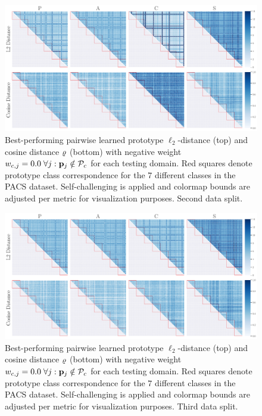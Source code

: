\begin{figure}[h]
    \centering
    \includegraphics[width=\textwidth]{Figures/Chapter4/2021-01-21-ProDropIncorrectWeight0.0WithSCdrop_f0.5SAVEResNet18oracle_validation_trial1.pdf}
    \caption[Second data split pairwise self-challenging prototype distances with $w_{c,j} = 0.0$] {Best-performing pairwise learned prototype $\ell_2$-distance (top) and cosine distance $\varrho$ (bottom) with negative weight $w_{c,j} = 0.0\; \forall j: \mathbf{p}_{j} \notin \mathcal{P}_c$ for each testing domain. Red squares denote prototype class correspondence for the $7$ different classes in the PACS dataset. Self-challenging is applied and colormap bounds are adjusted per metric for visualization purposes. Second data split.}
    \label{fig:pw_distance_0.0_trial1-sc}
\end{figure}

\begin{figure}[h]
    \centering
    \includegraphics[width=\textwidth]{Figures/Chapter4/2021-01-21-ProDropIncorrectWeight0.0WithSCdrop_f0.5SAVEResNet18oracle_validation_trial2.pdf}
    \caption[Third data split pairwise self-challenging prototype distances with $w_{c,j} = 0.0$] {Best-performing pairwise learned prototype $\ell_2$-distance (top) and cosine distance $\varrho$ (bottom) with negative weight $w_{c,j} = 0.0\; \forall j: \mathbf{p}_{j} \notin \mathcal{P}_c$ for each testing domain. Red squares denote prototype class correspondence for the $7$ different classes in the PACS dataset. Self-challenging is applied and colormap bounds are adjusted per metric for visualization purposes. Third data split.}
    \label{fig:pw_distance_0.0_trial2-sc}
\end{figure}